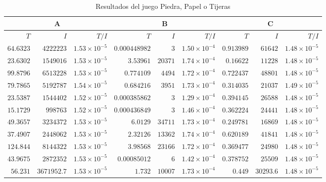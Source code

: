 \begin{table}[ht]
    \scriptsize
    \centering
    \begin{tabular}{r r r | r r r | r r r}
    \multicolumn{3}{c}{A} & \multicolumn{3}{c}{B} & \multicolumn{3}{c}{C} \\ \hline
    $T$ & $I$ & $T/I$ & $T$ & $I$ & $T/I$ & $T$ & $I$ & $T/I$ \\  \hline
    $64.6323$ & $4222223$ & $1.53 {\times} 10 ^{-5}$ & $0.000448982$ & $3$ & $1.50 {\times} 10 ^{-4}$ & $0.913989$ & $61642$ & $1.48 {\times} 10 ^{-5}$ \\
    $23.6302$ & $1549016$ & $1.53 {\times} 10 ^{-5}$ & $3.53961$ & $20371$ & $1.74 {\times} 10 ^{-4}$ & $0.16622$ & $11228$ & $1.48 {\times} 10 ^{-5}$ \\
    $99.8796$ & $6513228$ & $1.53 {\times} 10 ^{-5}$ & $0.774109$ & $4494$ & $1.72 {\times} 10 ^{-4}$ & $0.722437$ & $48801$ & $1.48 {\times} 10 ^{-5}$ \\
    $79.7865$ & $5192787$ & $1.54 {\times} 10 ^{-5}$ & $0.684216$ & $3951$ & $1.73 {\times} 10 ^{-4}$ & $0.314035$ & $21037$ & $1.49 {\times} 10 ^{-5}$ \\
    $23.5387$ & $1544402$ & $1.52 {\times} 10 ^{-5}$ & $0.000385862$ & $3$ & $1.29 {\times} 10 ^{-4}$ & $0.394145$ & $26588$ & $1.48 {\times} 10 ^{-5}$ \\
    $15.1729$ & $998763$ & $1.52 {\times} 10 ^{-5}$ & $0.000436849$ & $3$ & $1.46 {\times} 10 ^{-4}$ & $0.362224$ & $24441$ & $1.48 {\times} 10 ^{-5}$ \\
    $49.3657$ & $3234372$ & $1.53 {\times} 10 ^{-5}$ & $6.0129$ & $34711$ & $1.73 {\times} 10 ^{-4}$ & $0.249781$ & $16869$ & $1.48 {\times} 10 ^{-5}$ \\
    $37.4907$ & $2448062$ & $1.53 {\times} 10 ^{-5}$ & $2.32126$ & $13362$ & $1.74 {\times} 10 ^{-4}$ & $0.620189$ & $41841$ & $1.48 {\times} 10 ^{-5}$ \\
    $124.844$ & $8144322$ & $1.53 {\times} 10 ^{-5}$ & $3.98568$ & $23166$ & $1.72 {\times} 10 ^{-4}$ & $0.369477$ & $24980$ & $1.48 {\times} 10 ^{-5}$ \\
    $43.9675$ & $2872352$ & $1.53 {\times} 10 ^{-5}$ & $0.00085012$ & $6$ & $1.42 {\times} 10 ^{-4}$ & $0.378752$ & $25509$ & $1.48 {\times} 10 ^{-5}$ \\ \hline
    $56.231$ & $3671952.7$ & $1.53 {\times} 10 ^{-5}$ & $1.732$ & $10007$ & $1.73 {\times} 10 ^{-4}$ & $0.449$ & $30293.6$ & $1.48 {\times} 10 ^{-5}$ \\\hline
    \end{tabular}
    \caption{Resultados del juego Piedra, Papel o Tijeras}
    \label{tab:resultados-RPS}
\end{table}

